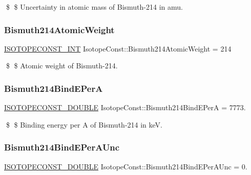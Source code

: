 \$ \$ Uncertainty in atomic mass of Bismuth-\/214 in amu. \mbox{\label{group___isotope_const-_bismuth-_bi214_ga7ef621aac91a0b515719cd56abc05d4c}} 
\subsubsection{\texorpdfstring{Bismuth214\+Atomic\+Weight}{Bismuth214AtomicWeight}}
{\footnotesize\ttfamily \mbox{\hyperlink{group___isotope_const-_macros_ga5f18360b3e99483a35c32d789e62621c}{I\+S\+O\+T\+O\+P\+E\+C\+O\+N\+S\+T\+\_\+\+I\+NT}} Isotope\+Const\+::\+Bismuth214\+Atomic\+Weight = 214}

\$ \$ Atomic weight of Bismuth-\/214. \mbox{\label{group___isotope_const-_bismuth-_bi214_gad626134e70fb2b3baa975453ce3198fa}} 
\subsubsection{\texorpdfstring{Bismuth214\+Bind\+E\+PerA}{Bismuth214BindEPerA}}
{\footnotesize\ttfamily \mbox{\hyperlink{group___isotope_const-_macros_ga8f45a7272ce02c0b4c65c44636ed719a}{I\+S\+O\+T\+O\+P\+E\+C\+O\+N\+S\+T\+\_\+\+D\+O\+U\+B\+LE}} Isotope\+Const\+::\+Bismuth214\+Bind\+E\+PerA = 7773.}

\$ \$ Binding energy per A of Bismuth-\/214 in keV. \mbox{\label{group___isotope_const-_bismuth-_bi214_gac2b0c40d4308e8c1857da4e3bd296151}} 
\subsubsection{\texorpdfstring{Bismuth214\+Bind\+E\+Per\+A\+Unc}{Bismuth214BindEPerAUnc}}
{\footnotesize\ttfamily \mbox{\hyperlink{group___isotope_const-_macros_ga8f45a7272ce02c0b4c65c44636ed719a}{I\+S\+O\+T\+O\+P\+E\+C\+O\+N\+S\+T\+\_\+\+D\+O\+U\+B\+LE}} Isotope\+Const\+::\+Bismuth214\+Bind\+E\+Per\+A\+Unc = 0.}

